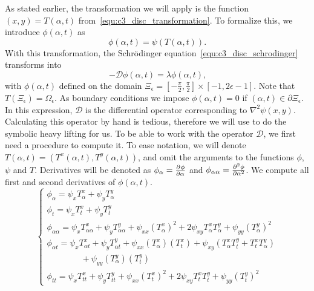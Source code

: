 As stated earlier, the transformation we will apply is the function $(x, y) = T(\alpha, t)$ from~\eqref{equ:c3_disc_transformation}. To formalize this, we introduce $\phi(\alpha, t)$ as
$$
  \phi(\alpha, t) = \psi(T(\alpha, t))\text{.}
$$
With this transformation, the Schrödinger equation~\eqref{equ:c3_disc_schrodinger} transforms into
\begin{equation}\label{equ:c3_disc_schrodinger_transformed}
  -\mathcal{D}\phi(\alpha, t) = \lambda\phi(\alpha, t)\text{,}
\end{equation}
with $\phi(\alpha, t)$ defined on the domain $\Xi_\epsilon = \left[-\frac{\pi}{2}, \frac{\pi}{2}\right] \times [-1, 2\epsilon - 1]$. Note that $T(\Xi_\epsilon) = \Omega_\epsilon$. As boundary conditions we impose $\phi(\alpha, t) = 0$ if $(\alpha, t) \in \partial\Xi_\epsilon$. In this expression, $\mathcal{D}$ is the differential operator corresponding to $\nabla^2\psi(x, y)$. Calculating this operator by hand is tedious, therefore we will use \sage{} to do the symbolic heavy lifting for us. To be able to work with the operator $\mathcal{D}$, we first need a procedure to compute it. To ease notation, we will denote $T(\alpha, t) = (T^{x}(\alpha, t), T^{y}(\alpha, t))$, and omit the arguments to the functions $\phi$, $\psi$ and $T$. Derivatives will be denoted as $\phi_\alpha = \pdv[]{\phi}{\alpha}$ and $\phi_{\alpha\alpha} = \pdv[2]{\phi}{\alpha}$. We compute all first and second derivatives of $\phi(\alpha, t)$.
\begin{equation}\label{equ:disc_transformation_derivatives}
  \begin{cases}
    \phi_\alpha = \psi_x T^x_\alpha + \psi_y T^y_\alpha                                                                                                                   \\
    \phi_t = \psi_x T^x_t + \psi_y T^y_t                                                                                                                                  \\
    \phi_{\alpha\alpha} = \psi_x T^x_{\alpha\alpha} + \psi_y T^y_{\alpha\alpha} + \psi_{xx} (T^x_\alpha)^2 + 2 \psi_{xy} T^x_\alpha T^y_\alpha + \psi_{yy} (T^y_\alpha)^2 \\
    \phi_{\alpha t} = \psi_x T^x_{\alpha t} + \psi_y T^y_{\alpha t} + \psi_{xx} (T^x_\alpha)(T^x_t) + \psi_{xy} \left(T^x_\alpha T^y_t + T^x_t T^y_\alpha \right)         \\
    \quad\quad\quad\quad {} + \psi_{yy} (T^y_\alpha)(T^y_t)                                                                                                               \\
    \phi_{tt} = \psi_x T^x_{tt} + \psi_y T^y_{tt} + \psi_{xx} (T^x_t)^2 + 2 \psi_{xy} T^x_t T^y_t + \psi_{yy} (T^y_t)^2
  \end{cases}
\end{equation}

